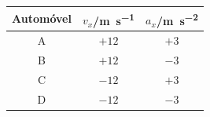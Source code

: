 \documentclass[11pt,a4paper]{article}
\begin{document}
	\begin{center}
		
		\renewcommand{\arraystretch}{1.35}
		
		\begin{tabular}{c|c|c}
			
			\toprule
			
			\textbf{Automóvel}
			&
			$v_x$/\si{m.s^{-1}}
			&
			$a_x$/\si{m.s^{-2}}
			
			\\
			
			\midrule
			
			A & $+12$ & $+3$\\
			
			B & $+12$ & $-3$\\
			
			C & $-12$ & $+3$\\
			
			D & $-12$ & $-3$\\
			
			\bottomrule
			
		\end{tabular}
		
	\end{center}
	
\end{document}
